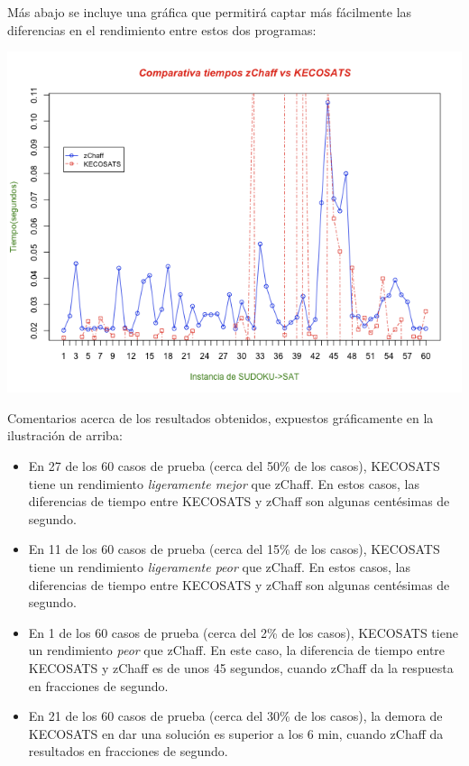 \documentclass[12pt,lettersize,oneside]{article}
\begin{document}


Más abajo se incluye una gráfica que permitirá captar más fácilmente las diferencias en el rendimiento entre estos dos programas:
\begin{center}
\includegraphics[scale=0.6]{compare.png}
\end{center}

Comentarios acerca de los resultados obtenidos, expuestos gráficamente en la ilustración de arriba:\vspace{-2.5mm}
\begin{itemize}
\item En 27 de los 60 casos de prueba (cerca del 50\% de los casos), KECOSATS
  tiene un rendimiento \emph{ligeramente mejor} que zChaff. En estos casos, las
  diferencias de tiempo entre KECOSATS y zChaff son algunas centésimas de
  segundo.
\item En 11 de los 60 casos de prueba (cerca del 15\% de los casos), KECOSATS
  tiene un rendimiento \emph{ligeramente peor} que zChaff. En estos casos, las
  diferencias de tiempo entre KECOSATS y zChaff son algunas centésimas de
  segundo.
\item En 1 de los 60 casos de prueba (cerca del 2\% de los casos), KECOSATS
  tiene un rendimiento \emph{peor} que zChaff. En este caso, la diferencia de
  tiempo entre KECOSATS y zChaff es de unos 45 segundos, cuando zChaff da la
  respuesta en fracciones de segundo.
\item En 21 de los 60 casos de prueba (cerca del 30\% de los casos), la demora
  de KECOSATS en dar una solución es superior a los 6 min, cuando zChaff da
  resultados en fracciones de segundo.
\end{itemize}
\end{document}

